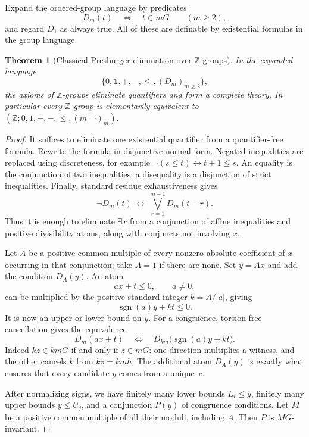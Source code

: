 \documentclass[11pt]{article}
\numberwithin{equation}{section}
\newtheorem{theorem}{Theorem}[section]
\theoremstyle{definition}
\theoremstyle{remark}
\newcommand{\Z}{\mathbb Z}
\newcommand{\one}{\mathbf 1}
\begin{document}
Expand the ordered-group language by predicates
\[
 D_m(t)\quad\Longleftrightarrow\quad t\in mG
 \qquad(m\geq2),
\]
and regard $D_1$ as always true. All of these are definable by existential
formulas in the group language.

\begin{theorem}[Classical Presburger elimination over $\Z$-groups]
\label{pma:pr:thm:qe}
In the expanded language
\[
 \{0,\one,+,-,\leq,(D_m)_{m\geq2}\},
\]
the axioms of $\Z$-groups eliminate quantifiers and form a complete theory.
In particular every $\Z$-group is elementarily equivalent to
$(\Z;0,1,+,-,\leq,(m\mid\cdot)_m)$.
\end{theorem}
\begin{proof}
It suffices to eliminate one existential quantifier from a quantifier-free
formula. Rewrite the formula in disjunctive normal form. Negated
inequalities are replaced using discreteness, for example
$\neg(s\leq t)\leftrightarrow t+1\leq s$. An equality is the conjunction
of two inequalities; a disequality is a disjunction of strict inequalities.
Finally, standard residue exhaustiveness gives
\[
 \neg D_m(t)\ \longleftrightarrow\
 \bigvee_{r=1}^{m-1} D_m(t-r).
\]
Thus it is enough to eliminate $\exists x$ from a conjunction of affine
inequalities and positive divisibility atoms, along with conjuncts not
involving $x$.

Let $A$ be a positive common multiple of every nonzero absolute coefficient
of $x$ occurring in that conjunction; take $A=1$ if there are none. Set
$y=Ax$ and add the condition $D_A(y)$. An atom
\[
 ax+t\leq0,\qquad a\neq0,
\]
can be multiplied by the positive standard integer $k=A/|a|$, giving
\[
 \operatorname{sgn}(a)y+kt\leq0.
\]
It is now an upper or lower bound on $y$. For a congruence, torsion-free
cancellation gives the equivalence
\begin{equation}
 D_m(ax+t)
 \quad\Longleftrightarrow\quad
 D_{km}\bigl(\operatorname{sgn}(a)y+kt\bigr).
 \label{pma:pr:eq:congscale}
\end{equation}
Indeed $kz\in kmG$ if and only if $z\in mG$: one direction multiplies a
witness, and the other cancels $k$ from $kz=kmh$.
The additional atom $D_A(y)$ is exactly what ensures that every candidate
$y$ comes from a unique $x$.

After normalizing signs, we have finitely many lower bounds $L_i\leq y$,
finitely many upper bounds $y\leq U_j$, and a conjunction $P(y)$ of
congruence conditions. Let $M$ be a positive common multiple of all their
moduli, including $A$. Then $P$ is $MG$-invariant.


\end{proof}
\end{document}
